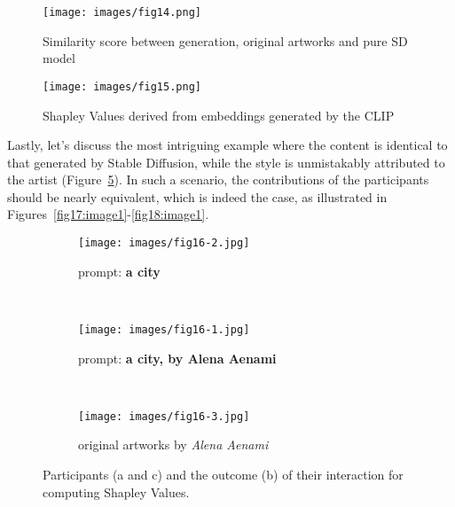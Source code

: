 \documentclass[12pt, letterpaper]{article}
\begin{document}
\begin{figure}[h]
    \centering
    \begin{minipage}{0.55\textwidth}
        \centering
        \texttt{[image: images/fig14.png]}
        \caption{Similarity score between generation, original artworks and pure SD model}
        \label{fig14:image1}
    \end{minipage}\hfill
    \begin{minipage}{0.40\textwidth}
        \centering
        \texttt{[image: images/fig15.png]}
        \caption{Shapley Values derived from embeddings generated by the CLIP}
        \label{fig15:image1}
    \end{minipage}
\end{figure}

Lastly, let's discuss the most intriguing example where the content is identical to that generated by Stable Diffusion, while the style is unmistakably attributed to the artist (Figure~\ref{fig16:stacked_images}). In such a scenario, the contributions of the participants should be nearly equivalent, which is indeed the case, as illustrated in Figures~\ref{fig17:image1}-\ref{fig18:image1}.

\begin{figure}[h]
    \centering
    
    \begin{subfigure}{0.8\textwidth}
        \centering
        \texttt{[image: images/fig16-2.jpg]}
        \caption{prompt: \textbf{a city}}
        \label{fig16:sub1}
    \end{subfigure}
    \\
    
    \begin{subfigure}{0.8\textwidth}
        \centering
        \texttt{[image: images/fig16-1.jpg]}
        \caption{prompt: \textbf{a city, by Alena Aenami}}
        \label{fig16:sub2}
    \end{subfigure}
    \\
   
    \begin{subfigure}{0.8\textwidth}
        \centering
        \texttt{[image: images/fig16-3.jpg]}
        \caption{original artworks by \textit{Alena Aenami}}
        \label{fig16:sub3}
    \end{subfigure}    

    \caption{Participants (a and c) and the outcome (b) of their interaction for computing Shapley Values.}
    \label{fig16:stacked_images}
\end{figure}
\end{document}
